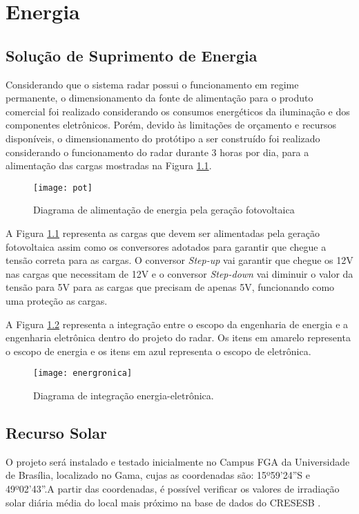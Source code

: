 \chapter{Energia}

\section{Solução de Suprimento de Energia}

Considerando que o sistema radar possui o funcionamento em regime permanente, o dimensionamento da fonte de alimentação para o produto comercial foi realizado considerando os consumos energéticos da iluminação e dos componentes eletrônicos. Porém, devido às limitações de orçamento e recursos disponíveis, o dimensionamento do protótipo a ser construído foi realizado considerando o funcionamento do radar durante 3 horas por dia, para a alimentação das cargas mostradas na Figura \ref{fig30}.

\begin{figure}[H]
\centering 
\texttt{[image: pot]}
\caption{\label{fig30}Diagrama de alimentação de energia pela geração fotovoltaica }
\end{figure}

A Figura \ref{fig30} representa as cargas que devem ser alimentadas pela geração fotovoltaica assim como os conversores adotados para garantir que chegue a tensão correta para as cargas. O conversor \textit{Step-up} vai garantir que chegue os 12V nas cargas que necessitam de 12V e o conversor \textit{Step-down} vai diminuir o valor da tensão para 5V para as cargas que precisam de apenas 5V, funcionando como uma proteção as cargas.

A Figura \ref{fig31} representa a integração entre o escopo da engenharia de energia e a engenharia eletrônica dentro do projeto do radar. Os itens em amarelo representa o escopo de energia e os itens em azul representa o escopo de eletrônica.

\begin{figure}[H]
\centering 
\texttt{[image: energronica]}
\caption{\label{fig31}Diagrama de integração energia-eletrônica.}
\end{figure}

\section{Recurso Solar}

O projeto será instalado e testado inicialmente no Campus FGA da Universidade de Brasília, localizado no Gama, cujas as coordenadas são: 15º59’24”S e 49º02’43”.A partir das coordenadas, é possível verificar os valores de irradiação solar diária média do local mais próximo na base de dados do CRESESB \cite{solar}.

